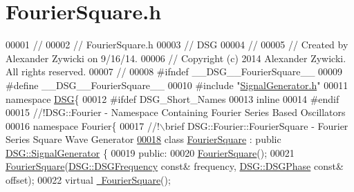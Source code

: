 \hypertarget{_fourier_square_8h_source}{\section{Fourier\+Square.\+h}
\label{_fourier_square_8h_source}
}

\begin{DoxyCode}
00001 \textcolor{comment}{//}
00002 \textcolor{comment}{//  FourierSquare.h}
00003 \textcolor{comment}{//  DSG}
00004 \textcolor{comment}{//}
00005 \textcolor{comment}{//  Created by Alexander Zywicki on 9/16/14.}
00006 \textcolor{comment}{//  Copyright (c) 2014 Alexander Zywicki. All rights reserved.}
00007 \textcolor{comment}{//}
00008 \textcolor{preprocessor}{#ifndef \_\_DSG\_\_FourierSquare\_\_}
00009 \textcolor{preprocessor}{#define \_\_DSG\_\_FourierSquare\_\_}
00010 \textcolor{preprocessor}{#include "\hyperlink{_signal_generator_8h}{SignalGenerator.h}"}
00011 \textcolor{keyword}{namespace }\hyperlink{namespace_d_s_g}{DSG}\{
00012 \textcolor{preprocessor}{#ifdef DSG\_Short\_Names}
00013     \textcolor{keyword}{inline}
00014 \textcolor{preprocessor}{#endif}
00015 \textcolor{comment}{    //!DSG::Fourier - Namespace Containing Fourier Series Based Oscillators}
00016 \textcolor{comment}{}    \textcolor{keyword}{namespace }Fourier\{\textcolor{comment}{}
00017 \textcolor{comment}{        //!\(\backslash\)brief DSG::Fourier::FourierSquare - Fourier Series Square Wave Generator}
\hypertarget{_fourier_square_8h_source_l00018}{}\hyperlink{class_d_s_g_1_1_fourier_1_1_fourier_square}{00018} \textcolor{comment}{}        \textcolor{keyword}{class }\hyperlink{class_d_s_g_1_1_fourier_1_1_fourier_square}{FourierSquare} : \textcolor{keyword}{public} \hyperlink{class_d_s_g_1_1_signal_generator}{DSG::SignalGenerator} \{
00019         \textcolor{keyword}{public}:
00020             \hyperlink{class_d_s_g_1_1_fourier_1_1_fourier_square_a48fa53b8b5ea77013e1bbb2b2467d15e}{FourierSquare}();
00021             \hyperlink{class_d_s_g_1_1_fourier_1_1_fourier_square_a48fa53b8b5ea77013e1bbb2b2467d15e}{FourierSquare}(\hyperlink{namespace_d_s_g_a4315a061386fa1014fda09b15d3a6973}{DSG::DSGFrequency} \textcolor{keyword}{const}& frequency,
      \hyperlink{namespace_d_s_g_a44431ce1eb0a7300efdd207bc879e52c}{DSG::DSGPhase} \textcolor{keyword}{const}& offset);
00022             \textcolor{keyword}{virtual} \hyperlink{class_d_s_g_1_1_fourier_1_1_fourier_square_af78565a799ebfd4be03cc0294dff1f85}{~FourierSquare}();

\end{DoxyCode}
